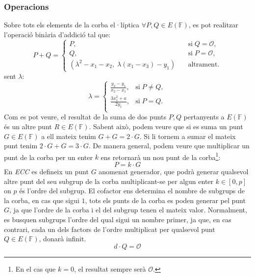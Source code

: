\documentclass{article}
\begin{document}
\subsubsection{Operacions}
Sobre tots els elements de la corba el·líptica $\forall P, Q \in E(\mathbb{F})$, es pot realitzar l'operació binària d'addició tal que:
\begin{equation*}
P + Q = \left \{ \begin{array}{ll}
	P, &\textrm{si} \; Q = \mathcal{O},\\
	Q, &\textrm{si} \; P = \mathcal{O},\\
	(\lambda^2 - x_1 - x_2, \; \lambda (x_1 - x_3) - y_1) \quad &\textrm{altrament}.
\end{array}
\right.
\end{equation*}
sent $\lambda$:
\begin{equation*}
	\lambda = \left \{ \begin{array}{ll}
		\frac{y_2 - y_1}{x_2 - x_1}, &\textrm{si} \; P \neq Q,\\
		\frac{3x_1^2 + a}{2y_1}, &\textrm{si} \; P = Q.\\
	\end{array}
	\right.
\end{equation*}
Com es pot veure, el resultat de la suma de dos punts $P, Q$ pertanyents a $E(\mathbb{F})$ és un altre punt $R \in E(\mathbb{F})$. Sabent això, podem veure que si es suma 	un punt $G \in E(\mathbb{F})$ a ell mateix tenim $G + G = 2 \cdot G$. Si li tornem a sumar el mateix punt tenim $2 \cdot G + G = 3 \cdot G$. De manera general, podem veure que multiplicar un punt de la corba per un enter $k$ ens retornarà un nou punt de la corba\footnote{En el cas que $k=0$, el resultat sempre serà $\mathcal{O}$.}:
\[P = k \cdot G\]
En \textit{ECC} es defineix un punt $G$ anomenat generador, que podrà generar qualsevol altre punt del seu subgrup de la corba multiplicant-se per algun enter $k \in [0, p]$ on $p$ és l'ordre del subgrup.
El cofactor ens determina el nombre de subgrups de la corba, en cas que sigui $1$, tots els punts de la corba es poden generar pel punt $G$, ja que l'ordre de la corba i el del subgrup tenen el mateix valor. Normalment, es busquen subgrups l'ordre del qual sigui un nombre primer, ja que, en cas contrari, cada un dels factors de l'ordre multiplicat per qualsevol punt $Q \in E(\mathbb{F})$, donarà infinit.
\[d \cdot Q = \mathcal{O}\]
\end{document}
